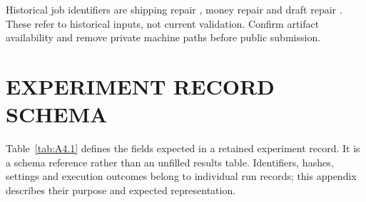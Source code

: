\documentclass[12pt,a4paper,oneside]{report}
\begin{document}
Historical job identifiers are shipping repair , money repair  and draft repair . These refer to historical inputs, not current validation. Confirm artifact availability and remove private machine paths before public submission.

\renewcommand{\chaptername}{APPENDIX}
\setcounter{chapter}{3}
\chapter{EXPERIMENT RECORD SCHEMA}

Table~\ref{tab:A4.1} defines the fields expected in a retained experiment record. It is a schema reference rather than an unfilled results table. Identifiers, hashes, settings and execution outcomes belong to individual run records; this appendix describes their purpose and expected representation.
\end{document}
